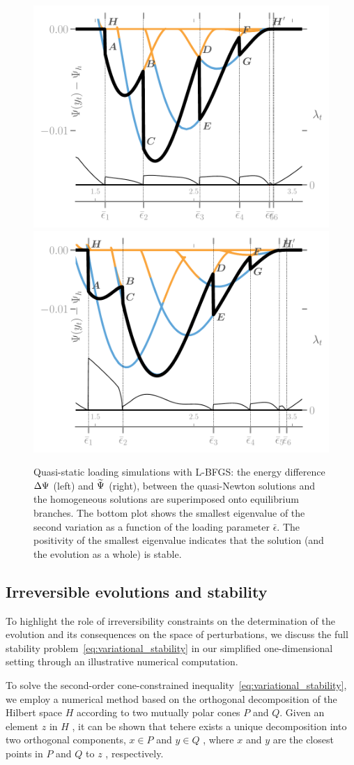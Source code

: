 \begin{figure}
    \hspace*{-.3cm}
    \includegraphics[width=.5\textwidth]{../images/model_stiff_energy_kick_algo.pdf} 
    \includegraphics[width=.5\textwidth]{../images/model_compliant_energy_kick_algo.pdf}
    \caption{
        Quasi-static loading simulations with L-BFGS: the energy difference $\Delta \Psi$ (left) and $\widetilde\Psi$ (right), between the quasi-Newton solutions and the homogeneous solutions are superimposed onto equilibrium branches. The bottom plot shows the smallest eigenvalue of the second variation as a function of the loading parameter $\bar\epsilon$. The positivity of the smallest eigenvalue indicates that the solution (and the evolution as a whole) is stable.
        }
    \label{fig:tempostable}
\end{figure}


\subsection{Irreversible evolutions and stability}
To highlight the role of irreversibility constraints on the determination of the evolution and its consequences on the space of perturbations, we discuss the full stability problem~\eqref{eq:variational_stability} in our simplified one-dimensional setting through an illustrative numerical computation. 

To solve the second-order cone-constrained inequality~\eqref{eq:variational_stability}, we employ a numerical method based on the orthogonal decomposition of the Hilbert space  $H$  according to two mutually polar cones  $P$  and  $Q$\cite{Moreau1962-fz}. Given an element  $z$  in  $H$ , it can be shown that tehere exists a unique decomposition into two orthogonal components,  $x \in P$  and  $y \in Q$ , where  $x$  and  $y$  are the closest points in  $P$  and  $Q$  to  $z$ , respectively.

